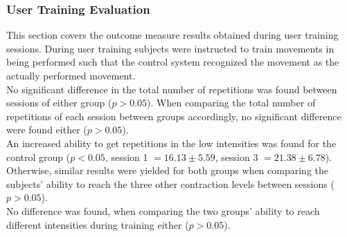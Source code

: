 \begin{multicols}{2}



\subsubsection*{User Training Evaluation} \label{sec:R:userTraining}

This section covers the outcome measure results obtained during user training sessions. During user training subjects were instructed to train movements in being performed such that the control system recognized the movement as the actually performed movement. \\%
No significant difference in the total number of repetitions was found between sessions of either group ($p > 0.05$). When comparing the total number of repetitions of each session between groups accordingly, no significant difference were found either ($p > 0.05$). \\ %
An increased ability to get repetitions in the low intensities was found for the control group ($p < 0.05$, session 1 $ = 16.13 \pm 5.59$, session 3 $= 21.38 \pm 6.78$). Otherwise, similar results were yielded for both groups when comparing the subjects' ability to reach the three other contraction levels between sessions ($p > 0.05$).\\
No difference was found, when comparing the two groups' ability to reach different intensities during training either ($p > 0.05$).

\end{multicols}
